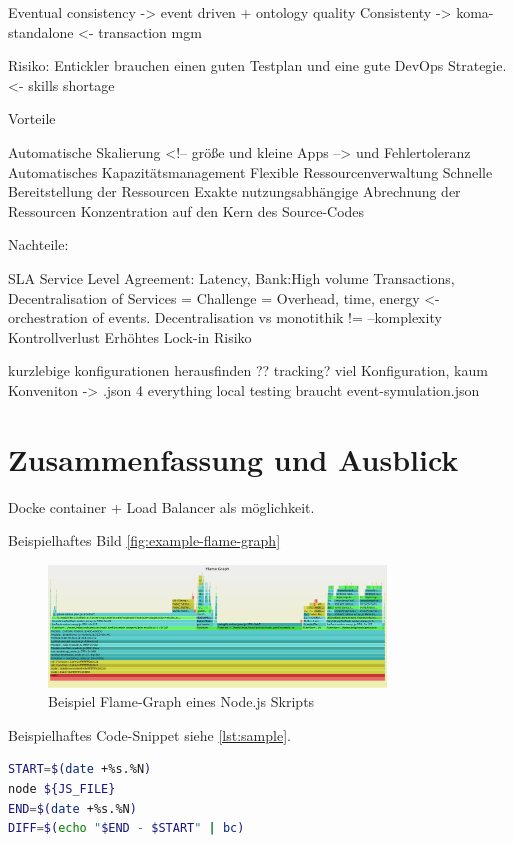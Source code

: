 \documentclass[
12pt,
english,
ngerman,
headsepline,
twoside,
openright,
numbers=noenddot,version=first
]{scrreprt}
\begin{document}
Eventual consistency -> event driven + ontology quality 
Consistenty -> koma-standalone <- transaction mgm

Risiko: 
Entickler brauchen einen guten Testplan und eine gute DevOps Strategie.<- skills shortage

Vorteile

Automatische Skalierung <!-- größe und kleine Apps --> und Fehlertoleranz
Automatisches Kapazitätsmanagement
Flexible Ressourcenverwaltung
Schnelle Bereitstellung der Ressourcen
Exakte nutzungsabhängige Abrechnung der Ressourcen
Konzentration auf den Kern des Source-Codes

Nachteile:

SLA Service Level Agreement: Latency, Bank:High volume Transactions, 
Decentralisation of Services = Challenge = Overhead, time, energy <- orchestration of events.
Decentralisation vs monotithik != --komplexity
Kontrollverlust
Erhöhtes Lock-in Risiko

kurzlebige konfigurationen herausfinden ?? tracking?
viel Konfiguration, kaum Konveniton -> .json 4 everything
local testing braucht event-symulation.json

\chapter{Zusammenfassung und Ausblick}

Docke container + Load Balancer
als möglichkeit.


Beispielhaftes Bild \autoref{fig:example-flame-graph}

\begin{figure}[h]
	\centering
	\includegraphics[width=0.8\textwidth]{pics/example-flame-graph.eps}
	\caption{Beispiel Flame-Graph eines Node.js Skripts}
	\label{fig:example-flame-graph}
\end{figure}

Beispielhaftes Code-Snippet siehe \autoref{lst:sample}.

\begin{lstlisting}[language=bash,caption={Aufnahme der \glqq real\grqq-Zeit},label={lst:sample}]
START=$(date +%s.%N)
node ${JS_FILE}
END=$(date +%s.%N)
DIFF=$(echo "$END - $START" | bc)
\end{lstlisting}
\end{document}
